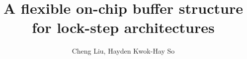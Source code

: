\documentclass{acm_proc_article-sp}
\begin{document}
\title{A flexible on-chip buffer structure for lock-step architectures}

\author{
\alignauthor
Cheng Liu, Hayden Kwok-Hay So\\
       \\
       \\
   }
\maketitle


\begin{abstract}

\end{abstract}
 









{\footnotesize}


\end{document}
